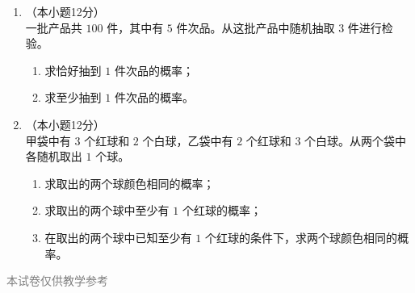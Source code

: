 \documentclass[12pt, a4paper]{ctexart}
\begin{document}
\begin{enumerate}[resume]
\item[21.]（本小题12分）\\
一批产品共 $100$ 件，其中有 $5$ 件次品。从这批产品中随机抽取 $3$ 件进行检验。
\begin{enumerate}[(1)]
  \item 求恰好抽到 $1$ 件次品的概率；
  \item 求至少抽到 $1$ 件次品的概率。
\end{enumerate}

\vspace{6cm}

\item[22.]（本小题12分）\\
甲袋中有 $3$ 个红球和 $2$ 个白球，乙袋中有 $2$ 个红球和 $3$ 个白球。从两个袋中各随机取出 $1$ 个球。
\begin{enumerate}[(1)]
  \item 求取出的两个球颜色相同的概率；
  \item 求取出的两个球中至少有 $1$ 个红球的概率；
  \item 在取出的两个球中已知至少有 $1$ 个红球的条件下，求两个球颜色相同的概率。
\end{enumerate}

\vspace{6cm}
\end{enumerate}

\vfill
\begin{center}
\small\textcolor{gray}{本试卷仅供教学参考}
\end{center}
\end{document}
